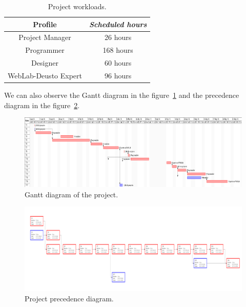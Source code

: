 \begin{table}[h]
	\centering
	\caption{Project workloads.}\label{tab:work}
	\begin{tabular}{cc}
		\toprule
		\textbf{Profile} & \emph{Scheduled hours} \\
		\midrule
		Project Manager			&	26 hours	\\
		Programmer				&	168 hours	\\
		Designer				&	60 hours	\\
		WebLab-Deusto Expert	&	96 hours	\\
		\bottomrule
	\end{tabular}
\end{table}

We can also observe the Gantt diagram in the figure~\ref{fig:gantt} and the precedence diagram in
the figure~\ref{fig:web}.

\begin{figure}
	\centering
	\includegraphics[width=\textheight, angle=-90]{fig/gantt}
	\caption{Gantt diagram of the project.}\label{fig:gantt}
\end{figure}

\begin{figure}
	\centering
	\includegraphics[width=\textheight, angle=-90]{fig/web}
	\caption{Project precedence diagram.}\label{fig:web}
\end{figure}
